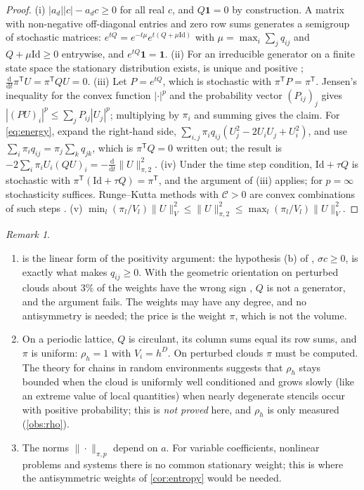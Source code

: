 \documentclass[11pt,a4paper]{article}
\theoremstyle{plain}
\theoremstyle{definition}
\theoremstyle{remark}
\newtheorem{remark}[theorem]{Remark}
\numberwithin{equation}{section}
\newcommand{\dd}{\mathrm{d}}
\newcommand{\Csp}{\mathcal{C}}
\newcommand{\A}[1]{\cite[#1]{Addendum}}
\begin{document}
\begin{proof}
(i) $|a_d||c|-a_dc\ge0$ for all real $c$, and $Q\mathbf 1=0$ by construction. A matrix with non-negative off-diagonal entries and zero row sums generates a semigroup of stochastic matrices: $e^{tQ}=e^{-t\mu}e^{t(Q+\mu\mathrm{Id})}$ with $\mu=\max_i\sum_jq_{ij}$ and $Q+\mu\mathrm{Id}\ge0$ entrywise, and $e^{tQ}\mathbf 1=\mathbf 1$. (ii) For an irreducible generator on a finite state space the stationary distribution exists, is unique and positive \cite[Ch.~3]{Norris1997}; $\frac{\dd}{\dd t}\pi^{\mathsf T}U=\pi^{\mathsf T}QU=0$. (iii) Let $P=e^{tQ}$, which is stochastic with $\pi^{\mathsf T}P=\pi^{\mathsf T}$. Jensen's inequality for the convex function $|\cdot|^p$ and the probability vector $(P_{ij})_j$ gives $|(PU)_i|^p\le\sum_jP_{ij}|U_j|^p$; multiplying by $\pi_i$ and summing gives the claim. For \eqref{eq:energy}, expand the right-hand side, $\sum_{i,j}\pi_iq_{ij}(U_j^2-2U_iU_j+U_i^2)$, and use $\sum_i\pi_iq_{ij}=\pi_j\sum_kq_{jk}$, which is $\pi^{\mathsf T}Q=0$ written out; the result is $-2\sum_i\pi_iU_i(QU)_i=-\frac{\dd}{\dd t}\|U\|^2_{\pi,2}$. (iv) Under the time step condition, $\mathrm{Id}+\tau Q$ is stochastic with $\pi^{\mathsf T}(\mathrm{Id}+\tau Q)=\pi^{\mathsf T}$, and the argument of (iii) applies; for $p=\infty$ stochasticity suffices. Runge--Kutta methods with $\Csp>0$ are convex combinations of such steps \A{Lem.~6.1}. (v) $\min_l(\pi_l/V_l)\|U\|_V^2\le\|U\|_{\pi,2}^2\le\max_l(\pi_l/V_l)\|U\|_V^2$.
\end{proof}

\begin{remark}\label{rem:markov}
\begin{enumerate}[label=(\roman*)]
\item {} is the linear form of the positivity argument: the hypothesis (b) of \A{Prop.~5.2}, $\sigma c\ge0$, is exactly what makes $q_{ij}\ge0$. With the geometric orientation on perturbed clouds about $3\%$ of the weights have the wrong sign \A{Rem.~5.4}, $Q$ is not a generator, and the argument fails. The weights may have any degree, and no antisymmetry is needed; the price is the weight $\pi$, which is not the volume.
\item On a periodic lattice, $Q$ is circulant, its column sums equal its row sums, and $\pi$ is uniform: $\rho_h=1$ with $V_i=h^D$. On perturbed clouds $\pi$ must be computed. The theory for chains in random environments suggests that $\rho_h$ stays bounded when the cloud is uniformly well conditioned and grows slowly (like an extreme value of local quantities) when nearly degenerate stencils occur with positive probability; this is \emph{not proved} here, and $\rho_h$ is only measured (\cref{obs:rho}).
\item The norms $\|\cdot\|_{\pi,p}$ depend on $a$. For variable coefficients, nonlinear problems and systems there is no common stationary weight; this is where the antisymmetric weights of \cref{cor:entropy} would be needed.
\end{enumerate}
\end{remark}
\end{document}

